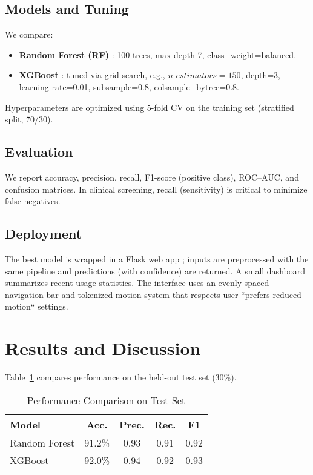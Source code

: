 \documentclass[conference]{IEEEtran}
\begin{document}
\subsection{Models and Tuning}
We compare:
\begin{itemize}
\item \textbf{Random Forest (RF)} \cite{breiman2001rf}: 100 trees, max depth 7, class\_weight=balanced.
\item \textbf{XGBoost} \cite{chen2016xgb}: tuned via grid search, e.g., \(n\_estimators=150\), depth=3, learning rate=0.01, subsample=0.8, colsample\_bytree=0.8.
\end{itemize}
Hyperparameters are optimized using 5-fold CV on the training set (stratified split, 70/30).

\subsection{Evaluation}
We report accuracy, precision, recall, F1-score (positive class), ROC--AUC, and confusion matrices. In clinical screening, recall (sensitivity) is critical to minimize false negatives.

\subsection{Deployment}
The best model is wrapped in a Flask web app \cite{flaskdocs}; inputs are preprocessed with the same pipeline and predictions (with confidence) are returned. A small dashboard summarizes recent usage statistics. The interface uses an evenly spaced navigation bar and tokenized motion system that respects user ``prefers-reduced-motion`` settings.

\section{Results and Discussion}
Table~\ref{tab:perf} compares performance on the held-out test set (30\%).

\begin{table}[!t]
\centering
\caption{Performance Comparison on Test Set}
\label{tab:perf}
\begin{tabular}{@{}lcccc@{}}
\toprule
\textbf{Model} & \textbf{Acc.} & \textbf{Prec.} & \textbf{Rec.} & \textbf{F1} \\
\midrule
Random Forest & 91.2\% & 0.93 & 0.91 & 0.92 \\
XGBoost & 92.0\% & 0.94 & 0.92 & 0.93 \\
\bottomrule
\end{tabular}
\end{table}
\end{document}
